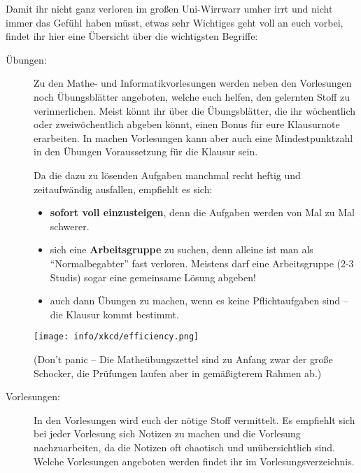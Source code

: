 Damit ihr nicht ganz verloren im gro\ss en Uni-Wirrwarr umher irrt und
  nicht immer das Gefühl haben müsst, etwas sehr Wichtiges geht
  voll an euch vorbei, findet ihr hier eine Übersicht über die wichtigsten Begriffe:

\begin{description}

\item [Übungen:] Zu den Mathe- und Informatikvorlesungen werden neben den Vorlesungen noch Übungsblätter angeboten, welche euch helfen, den gelernten Stoff zu verinnerlichen. Meist könnt ihr über die Übungsblätter, die ihr wöchentlich oder zweiwöchentlich abgeben könnt, einen Bonus für eure Klausurnote erarbeiten. In machen Vorlesungen kann aber auch eine Mindestpunktzahl in den Übungen Voraussetzung für die Klausur sein.

Da die dazu zu lösenden Aufgaben manchmal recht heftig und zeitaufwändig ausfallen, empfiehlt es sich:

\begin{itemize}

\item \textbf{sofort voll einzusteigen}, denn die Aufgaben werden von Mal
  zu Mal schwerer.

\item sich eine \textbf{Arbeitsgruppe} zu suchen, denn alleine ist man
  als "`Normalbegabter"' fast verloren. Meistens darf eine
  Arbeitsgruppe (2-3 Studis) sogar eine gemeinsame Lösung abgeben!

\item auch dann Übungen zu machen, wenn es keine Pflichtaufgaben sind --
  die Klausur kommt bestimmt.

\end {itemize}

\begin{center}
\texttt{[image: info/xkcd/efficiency.png]}
\end{center}


(Don't panic -- Die Matheübungszettel sind zu Anfang zwar der gro\ss e
  Schocker, die Prüfungen laufen aber in gemä\ss igterem Rahmen ab.)

\item [Vorlesungen:] In den Vorlesungen wird euch der nötige Stoff vermittelt. Es empfiehlt sich bei jeder Vorlesung sich Notizen zu machen und die Vorlesung nachzuarbeiten, da die Notizen oft chaotisch und unübersichtlich sind. Welche Vorlesungen angeboten werden findet ihr im Vorlesungsverzeichnis.	%


\end{description}
